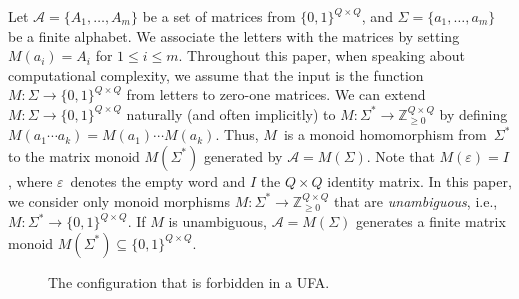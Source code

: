 \documentclass[11pt,a4paper]{amsart}
\newcommand{\Aa}{\mathcal{A}}
\theoremstyle{plain}
\theoremstyle{definition}
\theoremstyle{defC}
\theoremstyle{thmC}
\theoremstyle{plain}
\numberwithin{equation}{section}
\begin{document}
Let $\Aa = \{A_1, \ldots, A_m\}$ be a set of matrices from $\{0,1\}^{Q \times Q}$, and $\Sigma = \{a_1, \ldots, a_m\}$ be a finite alphabet.
We associate the letters with the matrices by setting $M(a_i) = A_i$ for $1 \le i \le m$.
Throughout this paper, when speaking about computational complexity, we assume that the input is the function $M \colon \Sigma \to \{0,1\}^{Q \times Q}$ from letters to zero-one matrices.
We can extend  $M \colon \Sigma \to \{0,1\}^{Q \times Q}$ naturally (and often implicitly) to $M \colon \Sigma^* \to \mathbb{Z}_{\ge 0}^{Q \times Q}$ by defining $M(a_1 \cdots a_k) = M(a_1) \cdots M(a_k)$. %
Thus, $M$~is a monoid homomorphism from~$\Sigma^*$ to the matrix monoid $M(\Sigma^*)$ generated by $\Aa = M(\Sigma)$.
Note that $M(\varepsilon) = I$, where $\varepsilon$~denotes the empty word and $I$ the $Q \times Q$ identity matrix. In this paper, we consider only monoid morphisms $M \colon \Sigma^* \to \mathbb{Z}_{\ge 0}^{Q \times Q}$ that are \emph{unambiguous}, i.e., $M \colon \Sigma^* \to \{0,1\}^{Q \times Q}$. If $M$ is unambiguous, $\Aa = M(\Sigma)$ generates a finite matrix monoid $M(\Sigma^*) \subseteq \{0,1\}^{Q \times Q}$.

\begin{figure}[h]\centering
{}
\caption{The configuration that is forbidden in a UFA.}\label{fig:diamond-free}
\end{figure}
\end{document}
